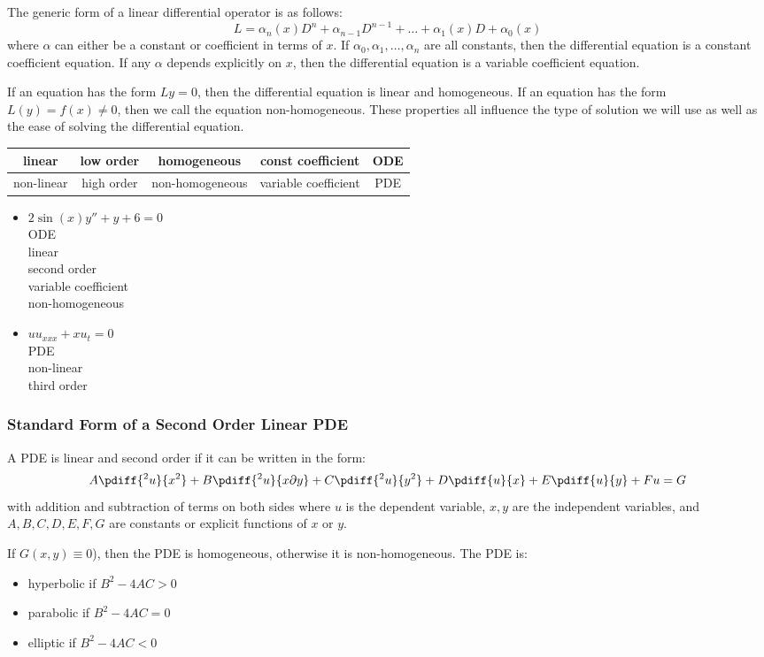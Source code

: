 \documentclass{math}
\begin{document}
The generic form of a linear differential operator is as follows:
\[ L = \alpha_n(x)D^n+\alpha_{n-1}D^{n-1}+\dots+\alpha_1(x)D+\alpha_0(x) \]
where \( \alpha \) can either be a constant or coefficient in terms of \( x \).
If \( \alpha_0,\alpha_1,\dots,\alpha_n \) are all constants, then the
differential equation is a constant coefficient equation. If any \( \alpha \)
depends explicitly on \( x \), then the differential equation is a variable
coefficient equation. \par
If an equation has the form \( Ly = 0 \), then the differential equation is
linear and homogeneous. If an equation has the form \( L(y) = f(x) \ne 0 \),
then we call the equation non-homogeneous. These properties all influence the
type of solution we will use as well as the ease of solving the differential
equation.
\begin{center}
  \begin{tabular}{|c|c|c|c|c|}
    \hline
    linear & low order & homogeneous & const coefficient & ODE \\
    \hline
    non-linear & high order & non-homogeneous & variable coefficient & PDE \\
    \hline
  \end{tabular}
\end{center}
\begin{itemize}
  \item \( 2\sin(x)y''+y+6 = 0 \) \\
    ODE \\
    linear \\
    second order \\
    variable coefficient \\
    non-homogeneous
  \item \( uu_{xxx}+xu_t = 0 \) \\
    PDE \\
    non-linear \\
    third order
\end{itemize}

\subsubsection*{Standard Form of a Second Order Linear PDE}
A PDE is linear and second order if it can be written in the form:
\[ A\pdiff{^2u}{x^2}+B\pdiff{^2u}{x\partial y}+C\pdiff{^2u}{y^2}+
  D\pdiff{u}{x}+E\pdiff{u}{y}+Fu = G \]
with addition and subtraction of terms on both sides where \( u \) is the
dependent variable, \( x,y \) are the independent variables, and
\( A,B,C,D,E,F,G \) are constants or explicit functions of \( x \) or \( y \).
\par
If \( G(x,y) \equiv 0 \)), then the PDE is homogeneous, otherwise it is
non-homogeneous. The PDE is:
\begin{itemize}
  \item hyperbolic if \( B^2-4AC > 0 \)
  \item parabolic if \( B^2-4AC = 0 \)
  \item elliptic if \( B^2-4AC < 0 \)
\end{itemize}
\end{document}
